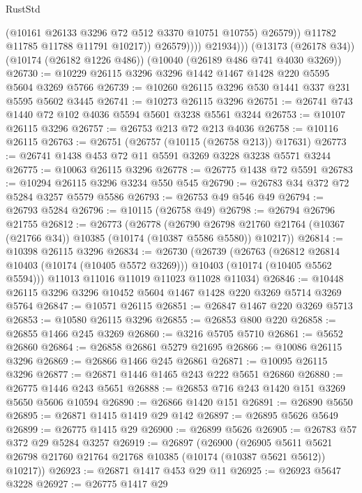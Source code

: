 \begin{lexlean}{RustStd}
\begin{coremodule}
                          (@10161 @26133 @3296 @72 @512 @3370 @10751 @10755)
                          @26579))
                      @11782
                      @11785
                      @11788
                      @11791
                      @10217))
                  @26579))))
          @21934)))
    (@13173 (@26178 @34))
    (@10174 (@26182 @1226 @486))
    (@10040 (@26189 @486 @741 @4030 @3269))
@26730 := @10229 @26115 @3296 @3296 @1442 @1467 @1428 @220 @5595 @5604 @3269 @5766
@26739 := @10260 @26115 @3296 @530 @1441 @337 @231 @5595 @5602 @3445
@26741 := @10273 @26115 @3296
@26751 := @26741 @743 @1440 @72 @102 @4036 @5594 @5601 @3238 @5561 @3244
@26753 := @10107 @26115 @3296
@26757 := @26753 @213 @72 @213 @4036
@26758 := @10116 @26115
@26763 := @26751 (@26757 (@10115 (@26758 @213)) @17631)
@26773 := @26741 @1438 @453 @72 @11 @5591 @3269 @3228 @3238 @5571 @3244
@26775 := @10063 @26115 @3296
@26778 := @26775 @1438 @72 @5591
@26783 := @10294 @26115 @3296 @3234 @550 @545
@26790 := @26783 @34 @372 @72 @5284 @3257 @5579 @5586
@26793 := @26753 @49 @546 @49
@26794 := @26793 @5284
@26796 := @10115 (@26758 @49)
@26798 := @26794 @26796 @21755
@26812 := @26773
    (@26778
      (@26790
        @26798
        @21760
        @21764
        (@10367 (@21766 @34))
        @10385
        (@10174 (@10387 @5586 @5580))
        @10217))
@26814 := @10398 @26115 @3296
@26834 := @26730
    (@26739
      (@26763
        (@26812 @26814 @10403 (@10174 (@10405 @5572 @3269)))
        @10403
        (@10174 (@10405 @5562 @5594)))
      @11013
      @11016
      @11019
      @11023
      @11028
      @11034)
@26846 := @10448 @26115 @3296 @3296 @10452 @5604 @1467 @1428 @220 @3269 @5714 @3269 @5764
@26847 := @10571 @26115
@26851 := @26847 @1467 @220 @3269 @5713
@26853 := @10580 @26115 @3296
@26855 := @26853 @800 @220
@26858 := @26855 @1466 @245 @3269
@26860 := @3216 @5705 @5710
@26861 := @5652 @26860
@26864 := @26858 @26861 @5279 @21695
@26866 := @10086 @26115 @3296
@26869 := @26866 @1466 @245 @26861
@26871 := @10095 @26115 @3296
@26877 := @26871 @1446 @1465 @243 @222 @5651 @26860
@26880 := @26775 @1446 @243 @5651
@26888 := @26853 @716 @243 @1420 @151 @3269 @5650 @5606 @10594
@26890 := @26866 @1420 @151
@26891 := @26890 @5650
@26895 := @26871 @1415 @1419 @29 @142
@26897 := @26895 @5626 @5649
@26899 := @26775 @1415 @29
@26900 := @26899 @5626
@26905 := @26783 @57 @372 @29 @5284 @3257
@26919 := @26897
    (@26900
      (@26905 @5611 @5621 @26798 @21760 @21764 @21768 @10385 (@10174 (@10387 @5621 @5612)) @10217))
@26923 := @26871 @1417 @453 @29 @11
@26925 := @26923 @5647 @3228
@26927 := @26775 @1417 @29

\end{coremodule}
\end{lexlean}
